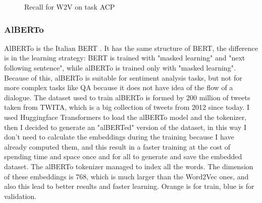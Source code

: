 \documentclass{article}
\begin{document}
\begin{figure}[!htb]
\begin{minipage}{0.48\textwidth}
                    \caption{Recall for W2V on task ACP}\label{Fig:Data3}
                \end{minipage}
            \end{figure}

            \subsubsection{AlBERTo}
            AlBERTo is the Italian BERT .
            It has the same structure of BERT, the difference is in the learning strategy: BERT is trained with "masked learning" and "next following sentence",
            while alBERTo is trained only with "masked learning".
            Because of this, alBERTo is suitable for sentiment analysis tasks, but not for more complex tasks like QA because it does not have idea of the flow of a dialogue.
            The dataset used to train alBERTo is formed by 200 million of tweets taken from TWITA, which is a big collection of tweets from 2012 since today.
            I used Huggingface Transformers to load the alBERTo model and the tokenizer, then I decided to generate an "alBERTed" version of the dataset,
            in this way I don't need to calculate the embeddings during the training because I have already computed them,
            and this result in a faster training at the cost of spending time and space once and for all to generate and save the embedded dataset.
            The alBERTo tokenizer managed to index all the words.
            The dimension of these embeddings is 768, which is much larger than the Word2Vec ones, and also this lead to better results and faster learning.
            \color{orange} Orange is for train, \color{blue} blue is for validation.\color{black}
\end{document}
